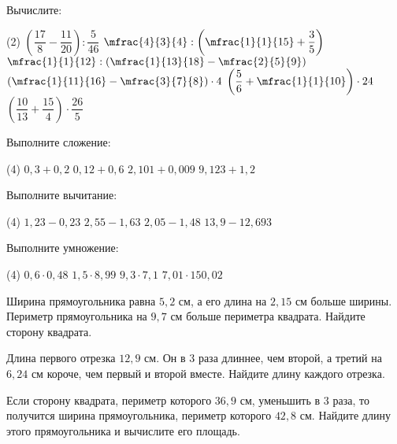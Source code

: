 \begin{class}[number=3]
	\begin{listofex}
		\item Вычислите:
		\begin{tasks}(2)
			\task \( \left( \dfrac{17}{8}-\dfrac{11}{20} \right):\dfrac{5}{46} \)
			\task \( \mfrac{4}{3}{4}:\left( \mfrac{1}{1}{15}+\dfrac{3}{5} \right) \)
			\task \( \mfrac{1}{1}{12}:\left( \mfrac{1}{13}{18}-\mfrac{2}{5}{9} \right) \)
			\task \( \left( \mfrac{1}{11}{16}-\mfrac{3}{7}{8} \right)\cdot4 \)
			\task \( \left( \dfrac{5}{6}+\mfrac{1}{1}{10} \right)\cdot24 \)
			\task \( \left( \dfrac{10}{13}+\dfrac{15}{4} \right)\cdot\dfrac{26}{5} \)
		\end{tasks}
		\item Выполните сложение:
		\begin{tasks}(4)
			\task \( 0,3+0,2 \)
			\task \( 0,12+0,6 \)
			\task \( 2,101+0,009 \)
			\task \( 9,123+1,2 \)
		\end{tasks}
		\item Выполните вычитание:
		\begin{tasks}(4)
			\task \( 1,23-0,23 \)
			\task \( 2,55-1,63 \)
			\task \( 2,05-1,48 \)
			\task \( 13,9-12,693 \)
		\end{tasks}
		\item Выполните умножение:
		\begin{tasks}(4)
			\task \( 0,6\cdot0,48 \)
			\task \( 1,5\cdot8,99 \)
			\task \( 9,3\cdot7,1 \)
			\task \( 7,01\cdot150,02 \)
		\end{tasks}
		\item Ширина прямоугольника равна \( 5,2 \) см, а его длина на \( 2,15 \) см больше ширины. Периметр прямоугольника на \( 9,7 \) см больше периметра квадрата. Найдите сторону квадрата.
		\item Длина первого отрезка \( 12,9 \) см. Он в \( 3 \) раза длиннее, чем второй, а третий на \( 6,24 \) см короче, чем первый и второй вместе. Найдите длину каждого отрезка.
		\item Если сторону квадрата, периметр которого \( 36,9 \) см, уменьшить в 3 раза, то получится ширина прямоугольника, периметр которого \( 42,8 \) см. Найдите длину этого прямоугольника и вычислите его площадь.
	\end{listofex}
\end{class}

